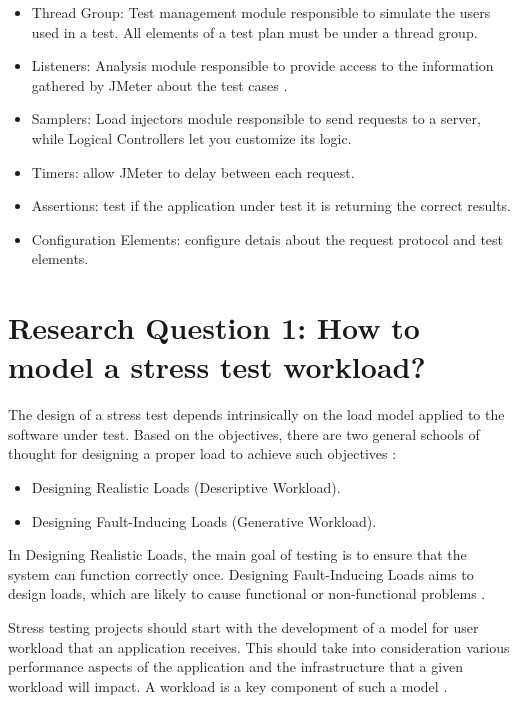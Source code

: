 \documentclass[espaco=umemeio,chapter=TITLE,twoside,openright]{abnt}
\begin{document}
\begin{itemize}
\item Thread Group: Test management module responsible to simulate the users used in a test. All elements of a test plan must be under a thread group.
\item Listeners: Analysis module responsible to provide access to the information gathered by JMeter about the test cases .
\item Samplers: Load injectors module responsible to send requests to a server, while Logical Controllers let you customize its logic.
\item Timers: allow JMeter to delay between each request.
\item Assertions: test if the application under test it is returning the correct results.
\item Configuration Elements: configure detais about the request protocol and test elements.
\end{itemize}



\FloatBarrier

\section{Research Question 1: How to  model a stress test workload?}


The design of a stress test depends intrinsically on the load model applied to the software under test. Based on the objectives, there are two general schools of thought for designing a proper load to achieve such objectives \cite{Afzal2009a}:

\begin{itemize}
\item Designing Realistic Loads (Descriptive Workload).
\item Designing Fault-Inducing Loads (Generative Workload).
\end{itemize}

In Designing Realistic Loads, the main goal of testing is to ensure that the system can function correctly once. Designing Fault-Inducing Loads  aims to design loads, which are likely to cause functional or non-functional problems \cite{Afzal2009a}.

Stress testing projects should start with the development of a model for user workload that an application receives. This should take into consideration various performance aspects of the application and the infrastructure that a given workload will impact. A workload is a key component of such a model \cite{Molyneaux2009}.
\end{document}
